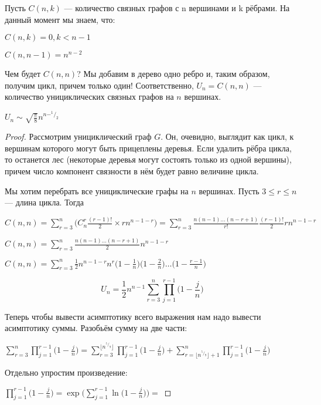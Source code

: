 Пусть $C(n,k) $ --- количество связных графов с n вершинами и k рёбрами. На данный момент мы знаем, что:

$C(n,k) = 0, k < n-1$

$C(n,n-1) = n^{n-2}$
 
 Чем будет $C(n,n)$? Мы добавим в дерево одно ребро и, таким образом, получим цикл, причем только один! Соответственно, $U_n = C(n,n)$ --- количество унициклических связных графов на $n$ вершинах.




\begin{thm}  
$ U_n \sim \sqrt{\frac \pi 8} n^{n-^1/_2} $
\end{thm}

\begin{proof}
Рассмотрим унициклический граф $ G $. Он, очевидно, выглядит как цикл, к вершинам которого могут быть прицеплены деревья. Если удалить рёбра цикла, то останется лес (некоторые деревья могут состоять только из одной вершины), причем число компонент связности в нём будет равно величине цикла. 

Мы хотим перебрать все унициклические графы на $n$ вершинах. Пусть $ 3 \leq r \leq n$ --- длина цикла. Тогда 

$C(n,n) = \sum \limits _{r=3} ^n \bigg (C^r_n \frac {(r-1)!} 2  \times r n ^{n-1-r} \bigg ) = \sum \limits _{r=3} ^n \frac {n (n-1) \dots (n-r+1)} {r!} \frac {(r-1)!} 2  r n ^{n-1-r}  $

$C(n,n) = \sum \limits _{r=3} ^n \frac {n (n-1) \dots (n-r+1)}  2   n ^{n-1-r}  $

$C(n,n) = \sum \limits _{r=3} ^n \frac 1 2    n ^{n-1-r} n^r \bigg( 1 - \frac 1 n \bigg)   \bigg( 1 - \frac 2 n \bigg) \dots \bigg( 1 - \frac {r-1} n \bigg) $

\[
U_n  = \frac 1 2 n ^ {n-1} \sum \limits _{r=3} ^n \prod \limits _{j=1} ^{r-1} \bigg ( 1 - \frac j n \bigg)
\] 

Теперь чтобы вывести асимптотику всего выражения нам надо вывести асимптотику суммы. Разобьём сумму на две части:

$\sum \limits _{r=3} ^n \prod \limits _{j=1} ^{r-1} \bigg ( 1 - \frac j n \bigg) =
 \sum \limits _{r=3} ^{\lfloor n^{^5/_9}\rfloor } \prod \limits _{j=1} ^{r-1} \bigg ( 1 - \frac j n \bigg) + 
 \sum \limits _{r = \lfloor n^{^5/_9}\rfloor + 1 } ^ n \prod \limits _{j=1} ^{r-1} \bigg ( 1 - \frac j n \bigg)
$

Отдельно упростим произведение:

$ \prod \limits _{j=1} ^{r-1} \bigg ( 1 - \frac j n \bigg) = \exp \bigg (\sum \limits _{j=1} ^{r-1} \ln \bigg ( 1 - \frac j n \bigg) \bigg ) =  $


\end{proof}
